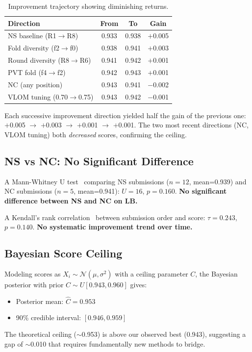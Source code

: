 \documentclass[a4paper,11pt]{article}
\begin{document}
\begin{table}[h]
\centering
\caption{Improvement trajectory showing diminishing returns.}
\begin{tabular}{lccc}
\toprule
Direction & From & To & Gain \\
\midrule
NS baseline (R1$\to$R8) & 0.933 & 0.938 & $+$0.005 \\
Fold diversity (f2$\to$f0) & 0.938 & 0.941 & $+$0.003 \\
Round diversity (R8$\to$R6) & 0.941 & 0.942 & $+$0.001 \\
PVT fold (f4$\to$f2) & 0.942 & 0.943 & $+$0.001 \\
NC (any position) & 0.943 & 0.941 & $-$0.002 \\
VLOM tuning (0.70$\to$0.75) & 0.943 & 0.942 & $-$0.001 \\
\bottomrule
\end{tabular}
\label{tab:diminishing}
\end{table}

Each successive improvement direction yielded half the gain of the previous one: $+$0.005 $\to$ $+$0.003 $\to$ $+$0.001 $\to$ $+$0.001.
The two most recent directions (NC, VLOM tuning) both \emph{decreased} scores, confirming the ceiling.

\subsection{NS vs NC: No Significant Difference}

A Mann-Whitney U test~\citep{mann1947test} comparing NS submissions ($n=12$, mean=0.939) and NC submissions ($n=5$, mean=0.941):
$U=16$, $p=0.160$. \textbf{No significant difference between NS and NC on LB.}

A Kendall's rank correlation~\citep{kendall1938new} between submission order and score:
$\tau=0.243$, $p=0.140$. \textbf{No systematic improvement trend over time.}

\subsection{Bayesian Score Ceiling}

Modeling scores as $X_i \sim \mathcal{N}(\mu, \sigma^2)$ with a ceiling parameter $C$,
the Bayesian posterior with prior $C \sim U[0.943, 0.960]$ gives:
\begin{itemize}
\item Posterior mean: $\hat{C} = 0.953$
\item 90\% credible interval: $[0.946, 0.959]$
\end{itemize}
The theoretical ceiling ($\sim$0.953) is above our observed best (0.943),
suggesting a gap of $\sim$0.010 that requires fundamentally new methods to bridge.
\end{document}
